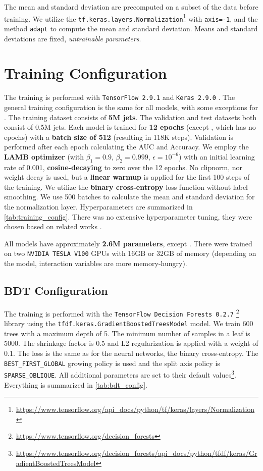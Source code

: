 The mean and standard deviation are precomputed on a subset of the data before training.
We utilize the \texttt{tf.keras.layers.Normalization}\footnote{\url{https://www.tensorflow.org/api_docs/python/tf/keras/layers/Normalization}} with \texttt{axis=-1}, and the method \texttt{adapt} to compute the mean and standard deviation.
Means and standard deviations are fixed, \emph{untrainable parameters}.


\section{Training Configuration}
\label{sec:training_config}

The training is performed with \texttt{TensorFlow 2.9.1} \cite{tf} and \texttt{Keras 2.9.0} \cite{keras}.
The general training configuration is the same for all models, with some exceptions for \bdt.
The training dataset consists of \textbf{5M jets}.
The validation and test datasets both consist of 0.5M jets.
Each model is trained for \textbf{12 epochs} (except \bdt, which has no epochs) with a \textbf{batch size of 512} (resulting in 118K steps).
Validation is performed after each epoch calculating the AUC and Accuracy.
We employ the \textbf{LAMB optimizer} (with $\beta_1= 0.9$, $\beta_2= 0.999$, $\epsilon= 10^{-6}$) with an initial learning rate of 0.001, \textbf{cosine-decaying} to zero over the 12 epochs.
No clipnorm, nor weight decay is used, but a \textbf{linear warmup} is applied for the first 100 steps of the training.
We utilize the \textbf{binary cross-entropy} loss function without label smoothing.
We use 500 batches to calculate the mean and standard deviation for the normalization layer.
Hyperparameters are summarized in \cref{tab:training_config}.
There was no extensive hyperparameter tuning, they were chosen based on related works \cite{deit3,part,cait,bert}.

All models have approximately \textbf{2.6M parameters}, except \bdt.
There were trained on two \texttt{NVIDIA TESLA V100} GPUs with 16GB or 32GB of memory (depending on the model, interaction variables are more memory-hungry).

\subsection{BDT Configuration}
\label{sec:bdt_config}

The training is performed with the \texttt{TensorFlow Decision Forests 0.2.7} \footnote{\url{https://www.tensorflow.org/decision_forests}} library using the \texttt{tfdf.keras.GradientBoostedTreesModel} model.
We train 600 trees with a maximum depth of 5.
The minimum number of samples in a leaf is 5000.
The shrinkage factor is 0.5 and L2 regularization is applied with a weight of 0.1.
The loss is the same as for the neural networks, the binary cross-entropy.
The \texttt{BEST\_FIRST\_GLOBAL} growing policy is used and the split axis policy is \texttt{SPARSE\_OBLIQUE}.
All additional parameters are set to their default values\footnote{\url{https://www.tensorflow.org/decision_forests/api_docs/python/tfdf/keras/GradientBoostedTreesModel}}.
Everything is summarized in \cref{tab:bdt_config}.

